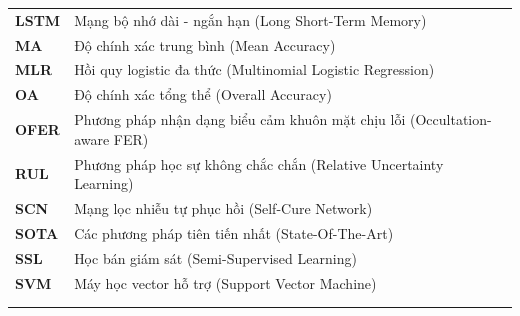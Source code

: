 \begin{longtable}{p{3.5cm} p{11.5cm}}
\textbf{LSTM} & Mạng bộ nhớ dài - ngắn hạn (Long Short-Term Memory) \\
\textbf{MA} & Độ chính xác trung bình (Mean Accuracy) \\
\textbf{MLR} & Hồi quy logistic đa thức (Multinomial Logistic Regression) \\
\textbf{OA} & Độ chính xác tổng thể (Overall Accuracy) \\
\textbf{OFER} & Phương pháp nhận dạng biểu cảm khuôn mặt chịu lỗi (Occultation-aware FER) \\
\textbf{RUL} & Phương pháp học sự không chắc chắn (Relative Uncertainty Learning) \\
\textbf{SCN} & Mạng lọc nhiễu tự phục hồi (Self-Cure Network) \\
\textbf{SOTA} & Các phương pháp tiên tiến nhất (State-Of-The-Art) \\
\textbf{SSL} & Học bán giám sát (Semi-Supervised Learning) \\
\textbf{SVM} & Máy học vector hỗ trợ (Support Vector Machine) \\

\multicolumn{2}{c}{} \\

\rowcolor{headerblue!25}
\multicolumn{2}{l}{\bfseries\color{headerblue}
    \quad Ký hiệu toán học} \\
    


\end{longtable}
